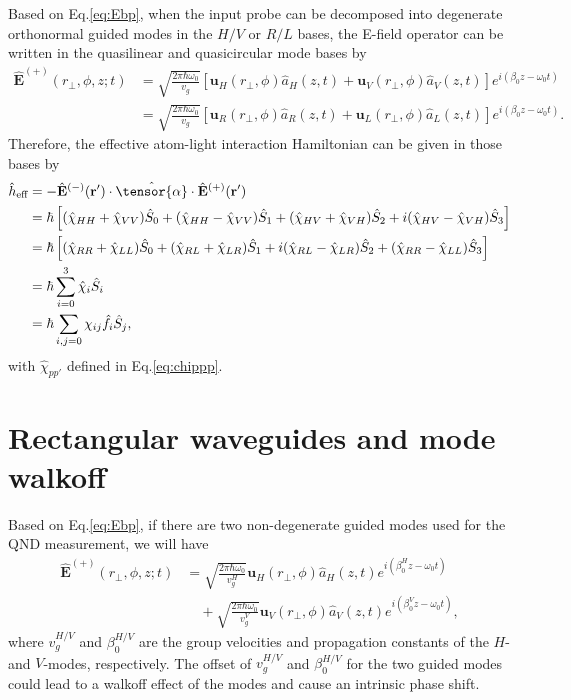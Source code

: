 \documentclass[preprint,aps,pra,onecolumn,superscriptaddress]{revtex4-1} %
\def\br{\mathbf{r}}
\newcommand{\nn}{\nonumber}
\newcommand{\eff}{\text{eff}}
\begin{document}
\begin{appendix}
Based on Eq.\eqref{eq:Ebp}, when the input probe can be decomposed into degenerate orthonormal guided modes in the $H/V $ or $ R/L $ bases, the E-field operator can be written in the quasilinear and quasicircular mode bases by 
\begin{align}
\hat{\mathbf{E}}^{(+)}(r\!_\perp,\phi,z;t) &= \sqrt{ \frac{2 \pi \hbar \omega_0}{ v_g} } \left[\mathbf{u}_H(r\!_\perp,\phi) \hat{a}_H(z,t) + \mathbf{u}_V(r\!_\perp,\phi) \hat{a}_V(z,t)\right]  e^{i (\beta_0 z- \omega_0 t)}\\
&= \sqrt{ \frac{2 \pi \hbar \omega_0}{ v_g} } \left[\mathbf{u}_R(r\!_\perp,\phi) \hat{a}_R(z,t) + \mathbf{u}_L(r\!_\perp,\phi) \hat{a}_L(z,t)\right]  e^{i (\beta_0 z- \omega_0 t)}.
\end{align}
Therefore, the effective atom-light interaction Hamiltonian can be given in those bases by 
\begin{align}
\hat{h}_\eff &= -\hat{\mathbf{E}}^{(-)}(\br')\cdot\hat{\tensor{\mathbf{\alpha}}}\cdot\hat{\mathbf{E}}^{(+)}(\br')\nn\\
&= \hbar\left[(\hat{\chi}_{HH}+\hat{\chi}_{VV})\hat{S}_0 + (\hat{\chi}_{HH}-\hat{\chi}_{VV})\hat{S}_1 + (\hat{\chi}_{HV}+\hat{\chi}_{VH})\hat{S}_2 + i(\hat{\chi}_{HV}-\hat{\chi}_{VH})\hat{S}_3 \right]\\
&= \hbar\left[(\hat{\chi}_{RR}+\hat{\chi}_{LL})\hat{S}_0 + (\hat{\chi}_{RL}+\hat{\chi}_{LR})\hat{S}_1 + i(\hat{\chi}_{RL}-\hat{\chi}_{LR})\hat{S}_2 + (\hat{\chi}_{RR}-\hat{\chi}_{LL})\hat{S}_3 \right]\\
&=\hbar\sum_{i=0}^3 \hat{\chi}_{i}\hat{S}_i\\
&=\hbar\sum_{i,j=0} \chi_{ij}\hat{f}_i\hat{S}_j,
\end{align}
with $\hat{\chi}_{pp'} $ defined in Eq.\eqref{eq:chippp}.


\section{Rectangular waveguides and mode walkoff}
Based on Eq.\eqref{eq:Ebp}, if there are two non-degenerate guided modes used for the QND measurement, we will have
\begin{align}\label{eq:EdifferentHV}
\hat{\mathbf{E}}^{(+)}(r\!_\perp,\phi,z;t) &= \sqrt{ \frac{2 \pi \hbar \omega_0}{ v_g^H} } \mathbf{u}_H(r\!_\perp,\phi) \hat{a}_H(z,t)  e^{i (\beta_0^H z- \omega_0 t)}\nn\\
&\quad +\sqrt{ \frac{2 \pi \hbar \omega_0}{ v_g^V} } \mathbf{u}_V(r\!_\perp,\phi) \hat{a}_V(z,t)  e^{i (\beta_0^V z- \omega_0 t)},
\end{align}
where $ v_g^{H/V} $ and $ \beta_0^{H/V} $ are the group velocities and propagation constants of the $ H $- and $ V $-modes, respectively. 
The offset of $ v_g^{H/V} $ and $ \beta_0^{H/V} $ for the two guided modes could lead to a walkoff effect of the modes and cause an intrinsic phase shift.


\end{appendix}
\end{document}
